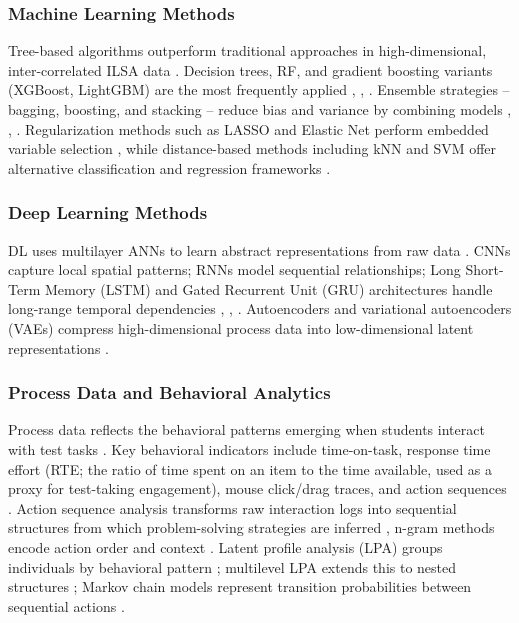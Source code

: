 \documentclass{ieeeaccess}
\begin{document}
\subsubsection{Machine Learning Methods}

Tree-based algorithms outperform traditional approaches in high-dimensional, inter-correlated ILSA data \cite{zheng-etal2023}. Decision trees, RF, and gradient boosting variants (XGBoost, LightGBM) are the most frequently applied \cite{aggarwal2022}, \cite{choi-sung2024}, \cite{bekdas-nigdeli2023,zema-etal2024}. Ensemble strategies -- bagging, boosting, and stacking -- reduce bias and variance by combining models \cite{kim2022}, \cite{zhou2021}, \cite{rokach-etal2023}. Regularization methods such as LASSO and Elastic Net perform embedded variable selection \cite{aggarwal2022}, while distance-based methods including kNN and SVM offer alternative classification and regression frameworks \cite{aydin-etal2023}.

\subsubsection{Deep Learning Methods}

DL uses multilayer ANNs to learn abstract representations from raw data \cite{rokach-etal2023, demir-karaboga2021}. CNNs capture local spatial patterns; RNNs model sequential relationships; Long Short-Term Memory (LSTM) and Gated Recurrent Unit (GRU) architectures handle long-range temporal dependencies \cite{ahmed-etal2023}, \cite{hochreiter-schmidhuber1997}, \cite{arthi-hemamalini2022}. Autoencoders and variational autoencoders (VAEs) compress high-dimensional process data into low-dimensional latent representations \cite{guo-etal-ercikan2024, cinelli-etal2021}.

\subsubsection{Process Data and Behavioral Analytics}

Process data reflects the behavioral patterns emerging when students interact with test tasks \cite{lee-etalUncoveringBehavioralPatterns2025}. Key behavioral indicators include time-on-task, response time effort (RTE; the ratio of time spent on an item to the time available, used as a proxy for test-taking engagement), mouse click/drag traces, and action sequences \cite{costa-etal2021, ding-etal2025, liang-etal2023}. Action sequence analysis transforms raw interaction logs into sequential structures from which problem-solving strategies are inferred \cite{li-etal2025}, n-gram methods encode action order and context \cite{ludwig-etal2024}. Latent profile analysis (LPA) groups individuals by behavioral pattern \cite{teig2023}; multilevel LPA extends this to nested structures \cite{kim-etal2024}; Markov chain models represent transition probabilities between sequential actions \cite{liang-etal2023}.
\end{document}

